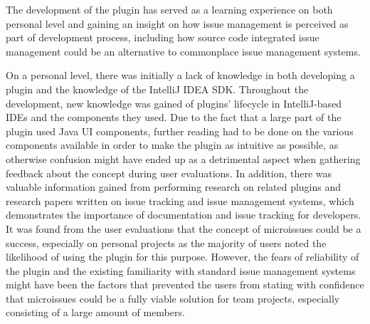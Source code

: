 \documentclass{4thYearProject}
\begin{document}
The development of the plugin has served as a learning experience on both personal level and gaining an insight on how issue management is perceived as part of development process, including how source code integrated issue management could be an alternative to commonplace issue management systems.

On a personal level, there was initially a lack of knowledge in both developing a plugin and the knowledge of the IntelliJ IDEA SDK. Throughout the development, new knowledge was gained of plugins' lifecycle in IntelliJ-based IDEs and the components they used. Due to the fact that a large part of the plugin used Java UI components, further reading had to be done on the various components available in order to make the plugin as intuitive as possible, as otherwise confusion might have ended up as a detrimental aspect when gathering feedback about the concept during user evaluations.  
In addition, there was valuable information gained from performing research on related plugins and research papers written on issue tracking and issue management systems, which demonstrates the importance of documentation and issue tracking for developers. It was found from the user evaluations that the concept of microissues could be a success, especially on personal projects as the majority of users noted the likelihood of using the plugin for this purpose. However, the fears of reliability of the plugin and the existing familiarity with standard issue management systems might have been the factors that prevented the users from stating with confidence that microissues could be a fully viable solution for team projects, especially consisting of a large amount of members.  





\end{document}
